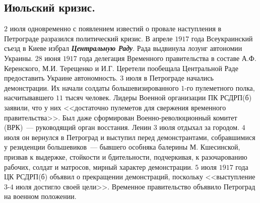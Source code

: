\documentclass[12pt]{article}
\begin{document}
	\subsection{Июльский кризис.}
	$2$ июля одновременно с появлением известий о провале наступления в Петрограде разразился политический кризис. В апреле $1917$ года Всеукраинский съезд в Киеве избрал \textbf{\textit{Центральную Раду}}. Рада выдвинула лозунг автономии Украины. $28$ июня $1917$ года делегация Временного правительства в составе А.Ф. Керенского, М.И. Терещенко и И.Г. Церетели пообещала Центральной Раде предоставить Украине автономность.
	$3$ июля в Петрограде начались демонстрации. Их начали солдаты большевизированного $1$-го пулеметного полка, насчитывавшего $11$ тысяч человек.
	Лидеры Военной организации ПК РСДРП(б) заявили, что у них <<достаточно пулеметов для свержения временного правительства>>. Был даже сформирован Военно-революционный комитет (ВРК)~--- руководящий орган восстания.
	Ленин $3$ июля отдыхал за городом. $4$ июля он вернулся в Петроград и выступил перед демонстрантами, собравшимися у резиденции большевиков~--- бывшего особняка балерины М. Кшесинской, призвав к выдержке, стойкости и бдительности, подчеркивая, к разочарованию рабочих, солдат и матросов, мирный характер демонстрации.
	$5$ июля $1917$ года ЦК РСДРП(б) объявил о прекращении демонстраций, поскольку <<выступление $3$-$4$ июля достигло своей цели>>. Временное правительство объявило Петроград на военном положении.
\end{document}
